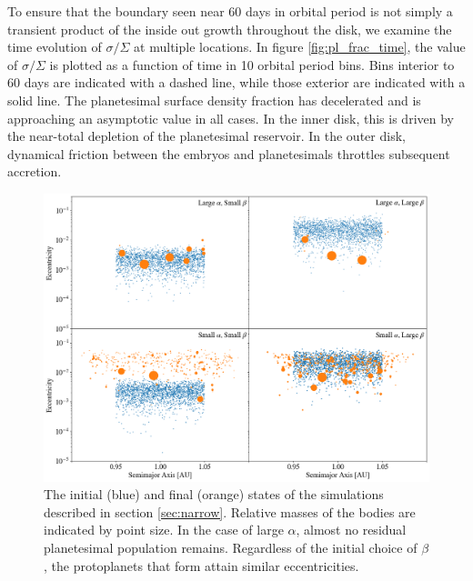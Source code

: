 \documentclass[twocolumn]{aastex63}
\begin{document}

To ensure that the boundary seen near 60 days in orbital period is not simply a transient product of the inside out growth throughout the disk, we examine the time evolution of $\sigma/\Sigma$ at multiple locations. In figure \ref{fig:pl_frac_time}, the value of $\sigma/\Sigma$ is plotted as a function of time in 10 orbital period bins. Bins interior to 60 days are indicated with a dashed line, while those exterior are indicated with a solid line. The planetesimal surface density fraction has decelerated and is approaching an asymptotic value in all cases. In the inner disk, this is driven by the near-total depletion of the planetesimal reservoir. In the outer disk, dynamical friction between the embryos and planetesimals throttles subsequent accretion.



\begin{figure}
\begin{center}
    \includegraphics[width=\textwidth]{figures/alpha_beta.png}
    \caption{The initial (blue) and final (orange) states of the simulations described in section \ref{sec:narrow}. Relative masses of the bodies are indicated by point size. In the case of large $\alpha$, almost no residual planetesimal population remains. Regardless of the initial choice of $\beta$, the protoplanets that form attain similar eccentricities. \label{fig:alpha_beta}}
\end{center}
\end{figure}
\end{document}
